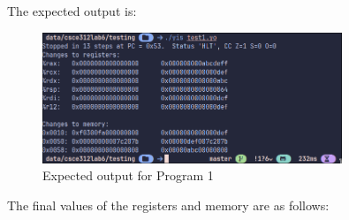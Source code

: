 \documentclass{article}
\begin{document}
The expected output is:

\begin{figure}[H]
    \centering
    \includegraphics[width=0.8\textwidth]{./images/test1_out.png}
    \caption{Expected output for Program 1}
\end{figure}

The final values of the registers and memory are as follows:
\end{document}
